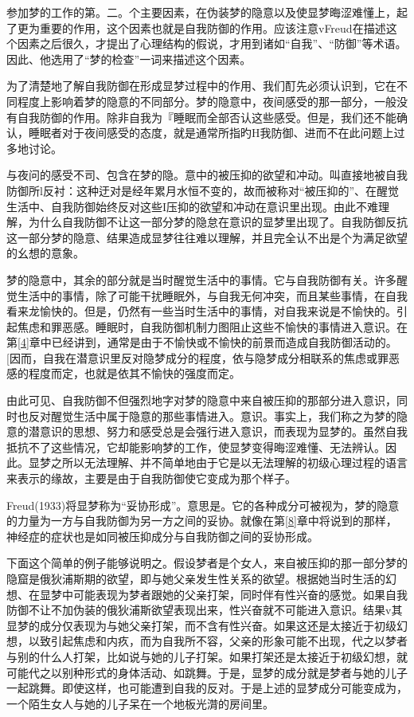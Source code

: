\documentclass[UTF8,10pt,a4paper,openany]{book}
\begin{document}
参加梦的工作的第。二。个主要因素，在伪装梦的隐意以及使显梦晦涩难懂上，起了更为重要的作用，这个因素也就是自我防御的作用。应该注意vFreud在描述这个因素之后很久，才提出了心理结构的假说，才用到诸如“自我”、“防御”等术语。因此、他选用了“梦的检查”一词来描述这个因素。

为了清楚地了解自我防御在形成显梦过程中的作用、我们酊先必须认识到，它在不同程度上影响着梦的隐意的不同部分。梦的隐意中，夜间感受的那一部分，一般没有自我防御的作用。除非自我为『睡眠而全部否认这些感受。但是，我们还不能确认，睡眠者对于夜间感受的态度，就是通常所指旳H我防御、进而不在此问题上过多地讨论。

与夜问的感受不司、包含在梦的隐。意中的被压抑的欲望和冲动。叫直接地被自我防御所l反衬：这种迂对是经年累月水恒不变的，故而被称对“被压抑的”、在醒觉生活中、自我防御始终反对这些I压抑的欲望和冲动在意识里出现。由此不难理解，为什么自我防御不让这一部分梦的隐怠在意识的显梦里出现了。自我防御反抗这一部分梦的隐意、结果造成显梦往往难以理解，并且完全认不出是个为满足欲望的幺想的意象。

梦的隐意中，其余的部分就是当时醒觉生活中的事情。它与自我防御有关。许多醒觉生活中的事情，除了可能干扰睡眠外，与自我无何冲突，而且某些事情，在自我看来龙愉快的。但是，仍然有一些当时生活中的事情，对自我来说是不愉快的。引起焦虑和罪恶感。睡眠时，自我防御机制力图阻止这些不愉快的事情进入意识。在第\ref{4}章中已经讲到，通常是由于不愉快或不愉快的前景而造成自我防御活动的。[因而，自我在潜意识里反对隐梦成分的程度，依与隐梦成分相联系的焦虑或罪恶感的程度而定，也就是依其不愉快的强度而定。

由此可见、自我防御不但强烈地字对梦的隐意中来自被压抑的那部分进入意识，同时也反对醒觉生活中属于隐意的那些事情进入。意识。事实上，我们称之为梦的隐意的潜意识的思想、努力和感受总是会强行进入意识，而表现为显梦的。虽然自我抵抗不了这些情况，它却能影响梦的工作，使显梦变得晦涩难懂、无法辨认。因此。显梦之所以无法理解、并不简单地由于它是以无法理解的初级心理过程的语言来表示的缘故，主要是由于自我防御使它变成为那个样子。

Freud(1933)将显梦称为“妥协形成”。意思是。它的各种成分可被视为，梦的隐意的力量为一方与自我防御为另一方之间的妥协。就像在第\ref{8}章中将说到的那样，神经症的症状也是如同被压抑成分与自我防御之间的妥协形成。

下面这个简单的例子能够说明之。假设梦者是个女人，来自被压抑的那一部分梦的隐窟是俄狄浦斯期的欲望，即与她父亲发生性关系的欲望。根据她当时生活的幻想、在显梦中可能表现为梦者跟她的父亲打架，同时伴有性兴奋的感觉。如果自我防御不让不加伪装的俄狄浦斯欲望表现出来，性兴奋就不可能进入意识。结果v其显梦的成分仅表现为与她父亲打架，而不含有性兴奋。如果这还是太接近于初级幻想，以致引起焦虑和内疚，而为自我所不容，父亲的形象可能不出现，代之以梦者与别的什么人打架，比如说与她的儿子打架。如果打架还是太接近于初级幻想，就可能代之以别种形式的身体活动、如跳舞。于是，显梦的成分就是梦者与她的儿子一起跳舞。即使这样，也可能遭到自我的反对。于是上述的显梦成分可能变成为，一个陌生女人与她的儿子呆在一个地板光潸的房间里。
\end{document}
